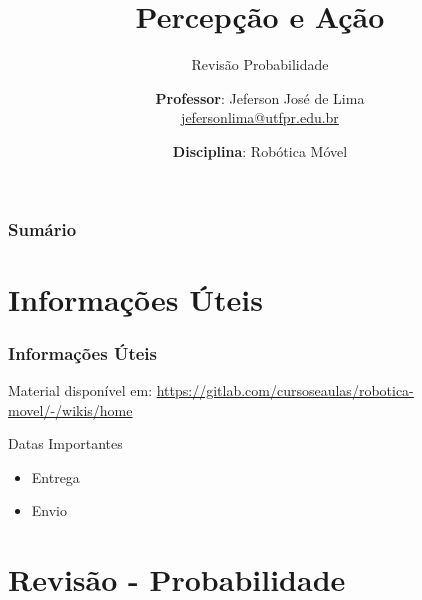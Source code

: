 \documentclass[t]{beamer}
\title[\textit{Conceitos de Percepção e Ação}]{
  Percepção e Ação}
\subtitle{Revisão Probabilidade}
\author[Professor: Jeferson José de Lima]{
  \textbf{Professor}: Jeferson José de Lima \\\medskip
  {\small \url{jefersonlima@utfpr.edu.br}}}
\institute[UTFPR-PB]{
  Departamento de Informática (DAINF)}
\date[2020.1]{\textbf{Disciplina}: Robótica Móvel}
\newcommand{\pausar}{\pause}
\begin{document}
\begin{frame}
  \titlepage
\end{frame}

\begin{frame}
	\frametitle{Sumário}
	{\small {\small \tableofcontents}}
\end{frame}


\section{Informações Úteis}
\begin{frame} 
	\frametitle{Informações Úteis}
	\begin{block}{Material disponível em:}
		\href{Robótica Móvel - Wiki}{https://gitlab.com/cursoseaulas/robotica-movel/-/wikis/home}
	\end{block}
	\pausar
	\begin{alertblock}{Datas Importantes}
		\begin{itemize}
		\item Entrega
		\item Envio
		\end{itemize}
	\end{alertblock}

\end{frame}

\section{Revisão - Probabilidade}
\end{document}
